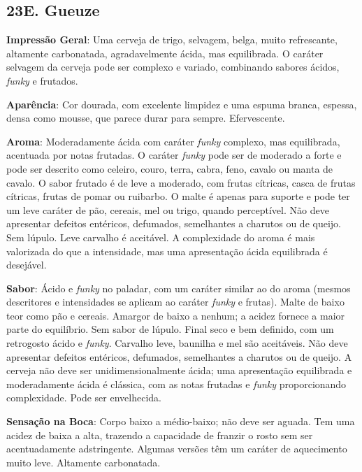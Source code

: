 \subsection*{23E. Gueuze}

\textbf{Impressão Geral}: Uma cerveja de trigo, selvagem, belga, muito refrescante, altamente carbonatada, agradavelmente ácida, mas equilibrada. O caráter selvagem da cerveja pode ser complexo e variado, combinando sabores ácidos, \textit{funky} e frutados.

\textbf{Aparência}: Cor dourada, com excelente limpidez e uma espuma branca, espessa, densa como mousse, que parece durar para sempre. Efervescente.

\textbf{Aroma}: Moderadamente ácida com caráter \textit{funky} complexo, mas equilibrada, acentuada por notas frutadas. O caráter \textit{funky} pode ser de moderado a forte e pode ser descrito como celeiro, couro, terra, cabra, feno, cavalo ou manta de cavalo. O sabor frutado é de leve a moderado, com frutas cítricas, casca de frutas cítricas, frutas de pomar ou ruibarbo. O malte é apenas para suporte e pode ter um leve caráter de pão, cereais, mel ou trigo, quando perceptível. Não deve apresentar defeitos entéricos, defumados, semelhantes a charutos ou de queijo. Sem lúpulo. Leve carvalho é aceitável. A complexidade do aroma é mais valorizada do que a intensidade, mas uma apresentação ácida equilibrada é desejável.

\textbf{Sabor}: Ácido e \textit{funky} no paladar, com um caráter similar ao do aroma (mesmos descritores e intensidades se aplicam ao caráter \textit{funky} e frutas). Malte de baixo teor como pão e cereais. Amargor de baixo a nenhum; a acidez fornece a maior parte do equilíbrio. Sem sabor de lúpulo. Final seco e bem definido, com um retrogosto ácido e \textit{funky}. Carvalho leve, baunilha e mel são aceitáveis. Não deve apresentar defeitos entéricos, defumados, semelhantes a charutos ou de queijo. A cerveja não deve ser unidimensionalmente ácida; uma apresentação equilibrada e moderadamente ácida é clássica, com as notas frutadas e \textit{funky} proporcionando complexidade. Pode ser envelhecida.

\textbf{Sensação na Boca}: Corpo baixo a médio-baixo; não deve ser aguada. Tem uma acidez de baixa a alta, trazendo a capacidade de franzir o rosto sem ser acentuadamente adstringente. Algumas versões têm um caráter de aquecimento muito leve. Altamente carbonatada.


